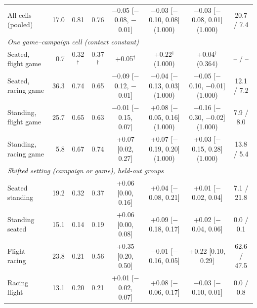 \begin{table}[t]
\begin{tabular}{@{}lrcccccc@{}}
All cells (pooled) & 17.0 & 0.81 & 0.76 & $-$0.05 [$-$0.08, $-$0.01] & $-$0.03 [$-$0.10, 0.08] (1.000) & $-$0.03 [$-$0.08, 0.01] (1.000) & 20.7 / 7.4 \\
\multicolumn{8}{l}{\emph{One game--campaign cell (context constant)}} \\
Seated, flight game & 0.7 & 0.32$^\dagger$ & 0.37$^\dagger$ & +0.05$^\dagger$ & +0.22$^\dagger$ (1.000) & +0.04$^\dagger$ (0.364) & -- / -- \\
Seated, racing game & 36.3 & 0.74 & 0.65 & $-$0.09 [$-$0.12, $-$0.01] & $-$0.04 [$-$0.13, 0.03] (1.000) & $-$0.05 [$-$0.10, $-$0.01] (1.000) & 12.1 / 7.2 \\
Standing, flight game & 25.7 & 0.65 & 0.63 & $-$0.01 [$-$0.15, 0.07] & +0.08 [$-$0.05, 0.16] (1.000) & $-$0.16 [$-$0.30, $-$0.02] (1.000) & 7.9 / 8.0 \\
Standing, racing game & 5.8 & 0.67 & 0.74 & +0.07 [0.02, 0.27] & +0.07 [$-$0.19, 0.20] (1.000) & +0.03 [$-$0.15, 0.28] (1.000) & 13.8 / 5.4 \\
\multicolumn{8}{l}{\emph{Shifted setting (campaign or game), held-out groups}} \\
Seated \ra{} standing & 19.2 & 0.32 & 0.37 & +0.06 [0.00, 0.16] & +0.04 [$-$0.08, 0.21] & +0.01 [$-$0.02, 0.04] & 7.1 / 21.8 \\
Standing \ra{} seated & 15.1 & 0.14 & 0.19 & +0.06 [0.00, 0.08] & +0.09 [$-$0.18, 0.17] & +0.02 [$-$0.04, 0.06] & 0.0 / 0.1 \\
Flight \ra{} racing & 23.8 & 0.21 & 0.56 & +0.35 [0.20, 0.50] & $-$0.01 [$-$0.16, 0.05] & +0.22 [0.10, 0.29] & 62.6 / 47.5 \\
Racing \ra{} flight & 13.1 & 0.20 & 0.21 & +0.01 [$-$0.02, 0.07] & +0.08 [$-$0.06, 0.17] & $-$0.03 [$-$0.10, 0.01] & 0.0 / 0.8 \\
\bottomrule
\end{tabular}
\end{table}
